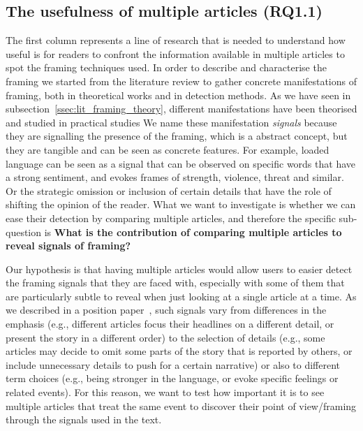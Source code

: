 

\subsection{The usefulness of multiple articles (RQ1.1)}
The first column represents a line of research that is needed to understand how useful is for readers to confront the information available in multiple articles to spot the framing techniques used.
In order to describe and characterise the framing we started from the literature review to gather concrete manifestations of framing, both in theoretical works and in detection methods.
As we have seen in subsection~\ref{ssec:lit_framing_theory}, different manifestations have been theorised and studied in practical studies
We name these manifestation \emph{signals} because they are signalling the presence of the framing, which is a abstract concept, but they are tangible and can be seen as concrete features.
For example, loaded language can be seen as a signal that can be observed on specific words that have a strong sentiment, and evokes frames of strength, violence, threat and similar.
Or the strategic omission or inclusion of certain details that have the role of shifting the opinion of the reader.
What we want to investigate is whether we can ease their detection by comparing multiple articles, 
and therefore the specific sub-question is \textbf{What is the contribution of comparing multiple articles to reveal signals of framing?}

Our hypothesis is that having multiple articles would allow users to easier detect the framing signals that they are faced with, especially with some of them that are particularly subtle to reveal when just looking at a single article at a time.
As we described in a position paper~\cite{mensio2020towards}, such signals vary from differences in the emphasis (e.g., different articles focus their headlines on a different detail, or present the story in a different order) to the selection of details (e.g., some articles may decide to omit some parts of the story that is reported by others, or include unnecessary details to push for a certain narrative) or also to different term choices (e.g., being stronger in the language, or evoke specific feelings or related events).
For this reason, we want to test how important it is to see multiple articles that treat the same event to discover their point of view/framing through the signals used in the text.

